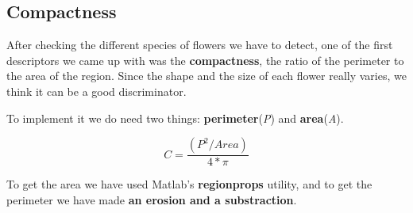 \documentclass[11]{article}
\begin{document}
\subsection{Compactness}
After checking the different species of flowers we have to detect, one of the first descriptors we came up with was the \textbf{compactness}, the ratio of the perimeter to the area of the region. Since the shape and the size of each flower really varies, we think it can be a good discriminator. 
\medskip

To implement it we do need two things: \textbf{perimeter}(\textit{P}) and \textbf{area}(\textit{A}).

$$C= \frac{(P^2 / Area)} {4*\pi}$$
  \medskip
  
 To get the area we have used Matlab's \textbf{regionprops} utility, and to get the perimeter we have made \textbf{an erosion and a substraction}. 
 \medskip 
 
\end{document}
